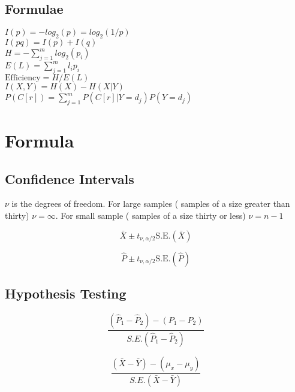 \subsection{Formulae}

$I(p) = - log_{2}(p) = log_{2}(1/p)$\\

$I(pq) = I(p) + I(q)$\\

$H = - \sum_{j=1}^{m} log_{2}(p_{i})$\\

$E(L) = \sum_{j=1}^{m} l_{i} p_{i}$\\

$\mbox{Efficiency} = H / E(L)$\\

$I(X,Y) = H(X) - H(X|Y)$\\

$P(C[r]) = \sum_{j=1}^{m}P(C[r]|Y=d_{j} )P(Y=d_{j} )$


\section{Formula}

\subsection{Confidence Intervals}

$\nu$ is the degrees of freedom. For large samples ( samples of a
size greater than thirty) $\nu = \infty$. For small sample (
samples of a size thirty or less)  $\nu = n-1$

\begin{equation}
\bar{X} \pm t_{\nu,\alpha/2}\mbox{S.E.}(\bar{X})
\end{equation}

\begin{equation}
\hat{P} \pm t_{\nu,\alpha/2}\mbox{S.E.}(\hat{P})
\end{equation}

\subsection{Hypothesis Testing}
\begin{equation}
\frac{(\hat{P}_{1}-\hat{P}_{2})-(P_{1}-P_{2})}{S.E.(\hat{P}_{1}-\hat{P}_{2})}
\end{equation}

\begin{equation}
\frac{(\bar{X}-\bar{Y})-(\mu_{x}-\mu_{y})}{S.E.(\bar{X}-\bar{Y})}
\end{equation}



